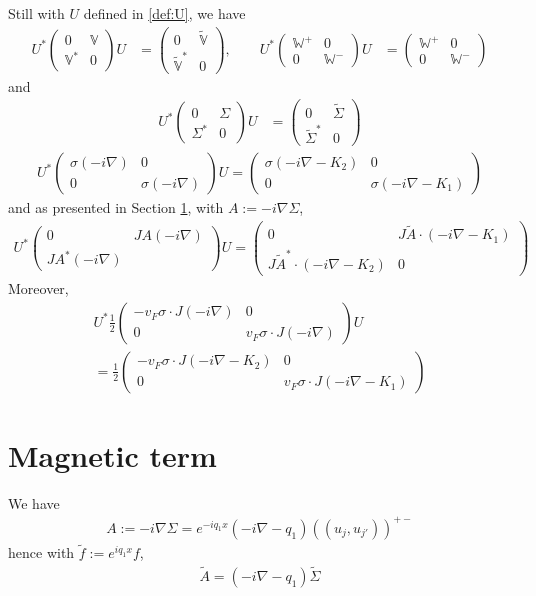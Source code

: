 \documentclass[11pt,a4paper,reqno,french,tikz]{amsart}
\newcommand{\pa}[1]{\left( #1 \right)} %
\newcommand{\na}{\nabla} %
\newcommand{\f}[2]{\frac{#1}{#2}} %
\newcommand{\mat}[1]{\begin{pmatrix} #1 \end{pmatrix}} %
\newcommand{\bbV}{\mathbb{V}}
\newcommand{\db}[1]{\left(\!\left( #1 \right)\!\right)}
\def\bbV{{\mathbb V}}
\def\bbW{{\mathbb W}}
\begin{document}
Still with $U$ defined in \eqref{def:U}, we have
\begin{align*}
U^* \mat{0 & \bbV \\ \bbV^* & 0} U &= \mat{0 & \widetilde{\bbV} \\ \widetilde{\bbV}^* & 0},\qquad U^* \mat{\bbW^+ & 0 \\ 0 & \bbW^-} U &= \mat{\bbW^+ & 0 \\ 0 & \bbW^-}
\end{align*}
and
\begin{align*}
U^* \mat{0 & \Sigma \\ \Sigma^* & 0} U &= \mat{0 & \widetilde{\Sigma} \\ \widetilde{\Sigma}^* & 0}
\end{align*}
\begin{align*}
	U^* \mat{\sigma \pa{-i\na} & 0 \\ 0 & \sigma \pa{-i\na}} U = \mat{\sigma \pa{-i\na - K_2} & 0 \\ 0 & \sigma \pa{-i\na- K_1}} 
\end{align*}
and as presented in Section \ref{sub:magnetic_term}, with $A := -i\na\Sigma$,
\begin{multline*}
	U^* \mat{0 & JA (-i\na) \\ JA^* (-i\na)} U = \mat{0 & J \widetilde{A} \cdot(-i\na - K_1) \\  J\widetilde{A}^* \cdot(-i\na - K_2) & 0}
\end{multline*}
Moreover,
\begin{multline*}
U^* \f 12 \mat{- v_F \sigma\cdot J(-i\na) & 0 \\ 0 & v_F \sigma\cdot J(-i\na)} U  \\
= \f 12 \mat{- v_F \sigma\cdot J(-i\na - K_2) & 0 \\ 0 & v_F \sigma\cdot J(-i\na - K_1)}
\end{multline*}



\section{Magnetic term}%
\label{sub:magnetic_term}

We have
\begin{align*}
A := -i\na \Sigma = e^{-iq_1 x} \pa{-i\na - q_1} \db{u_j,u_{j'}}^{+-}
\end{align*}
hence with $\widetilde{f} := e^{iq_1 x} f$,
\begin{align*}
\widetilde{A} = \pa{-i\na - q_1} \widetilde{\Sigma}
\end{align*}
\end{document}
